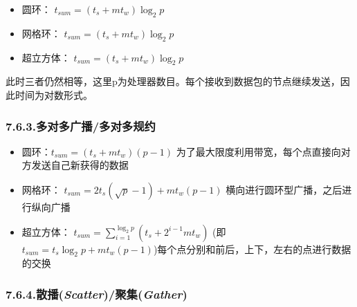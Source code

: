 \documentclass{article}
\begin{document}
\begin{itemize}[noitemsep,topsep=\mdcompacttopsep]%

\item{}圆环： $t_{sum} = (t_s + mt_w) \log _2 p$%

\item{}网格环： $t_{sum} = (t_s + mt_w) \log _2 p$%

\item{}超立方体： $t_{sum} = (t_s + mt_w) \log _2 p$%
\end{itemize}%

\noindent{}此时三者仍然相等，这里p为处理器数目。每个接收到数据包的节点继续发送，因此时间为对数形式。%

\subsubsection{7.6.3.\hspace*{0.5em}多对多广播/多对多规约}\label{section}%

\begin{itemize}[noitemsep,topsep=\mdcompacttopsep]%

\item{}圆环：$t_{sum} = (t_s + mt_w)(p - 1)$ 为了最大限度利用带宽，每个点直接向对方发送自己新获得的数据%

\item{}网格环： $t_{sum} = 2t_s(\sqrt {p} - 1) + mt_w(p  - 1)$ 横向进行圆环型广播，之后进行纵向广播%

\item{}超立方体：  $t_{sum} = \sum^{\log _2 p}_{i=1}{(t_s+2^{i - 1}m{t_w})}$  (即$t_{sum} = t_s{\log _2 p} + mt_w(p - 1)$)每个点分别和前后，上下，左右的点进行数据的交换%
\end{itemize}%

\subsubsection{7.6.4.\hspace*{0.5em}散播(\emph{Scatter})/聚集(\emph{Gather})}\label{sec--scatter--gather-}%
\end{document}
